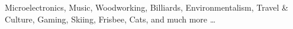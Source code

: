 \item[Other Interests:] Microelectronics, Music, Woodworking, Billiards,
Environmentalism, Travel \& Culture, Gaming, Skiing, Frisbee, Cats, and much
more \ldots
